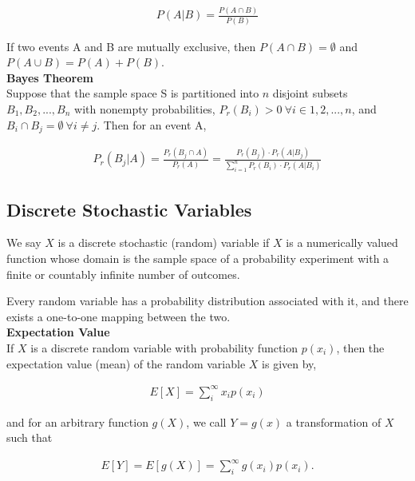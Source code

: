 \documentclass{article}
\numberwithin{theorem}{subsection}
\numberwithin{theorem}{subsubsection}
\theoremstyle{definition}
\numberwithin{definition}{subsection}
\numberwithin{definition}{subsubsection}
\begin{document}
\begin{gather*}
    P(A|B) = \frac{P(A \cap B)}{P(B)}
\end{gather*}

\noindent If two events A and B are mutually exclusive, then $P(A \cap B) = \emptyset$ and $P(A \cup B) = P(A) + P(B)$.\\

\noindent \textbf{Bayes Theorem} \\
\indent Suppose that the sample space S is partitioned into $n$ disjoint subsets $B_{1},B_{2},...,B_{n}$ with nonempty probabilities, $P_{r}(B_{i}) > 0\ \forall i \in {1,2,...,n}$, and $B_{i} \cap B_{j} = \emptyset\ \forall i \neq j$. Then for an event A,

\begin{gather*}
    P_{r}(B_{j} | A) = \frac{P_{r}(B_{j} \cap A)}{P_{r}(A)} = \frac{P_{r}(B_{j}) \cdot P_{r}(A | B_{j})}{\sum_{i = 1}^{n} P_{r}(B_{i}) \cdot P_{r}(A | B_{i})}
\end{gather*}


\subsection{Discrete Stochastic Variables}

We say $X$ is a discrete stochastic (random) variable if $X$ is a numerically valued function whose domain is the sample space of a probability experiment with a finite or countably infinite number of outcomes. \par
Every random variable has a probability distribution associated with it, and there exists a one-to-one mapping between the two. \\

\noindent \textbf{Expectation Value} \\
\indent If $X$ is a discrete random variable with probability function $p(x_{i})$, then the expectation value (mean) of the random variable $X$ is given by,

\begin{gather*}
    E[X] = \sum_{i}^{\infty} x_{i}p(x_{i})
\end{gather*}

\noindent and for an arbitrary function $g(X)$, we call $Y = g(x)$ a transformation of $X$ such that

\begin{gather*}
    E[Y] = E[g(X)] = \sum_{i}^{\infty} g(x_{i})p(x_{i}).
\end{gather*}
\end{document}
